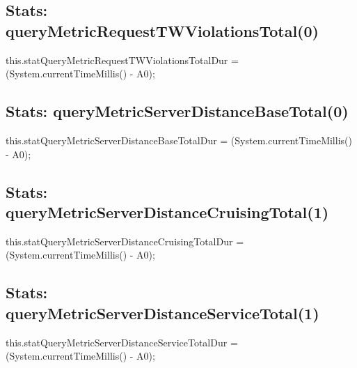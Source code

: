 \subsection{Stats: queryMetricRequestTWViolationsTotal(0)}
\nwenddocs{}\endmoddef{}
this.statQueryMetricRequestTWViolationsTotalDur = (System.currentTimeMillis() - A0);
\nwendcode{}\nwdocspar

\subsection{Stats: queryMetricServerDistanceBaseTotal(0)}
\nwenddocs{}\endmoddef{}
this.statQueryMetricServerDistanceBaseTotalDur = (System.currentTimeMillis() - A0);
\nwendcode{}\nwdocspar

\subsection{Stats: queryMetricServerDistanceCruisingTotal(1)}
\nwenddocs{}\endmoddef{}
this.statQueryMetricServerDistanceCruisingTotalDur = (System.currentTimeMillis() - A0);
\nwendcode{}\nwdocspar

\subsection{Stats: queryMetricServerDistanceServiceTotal(1)}
\nwenddocs{}\endmoddef{}
this.statQueryMetricServerDistanceServiceTotalDur = (System.currentTimeMillis() - A0);
\nwendcode{}\nwdocspar

